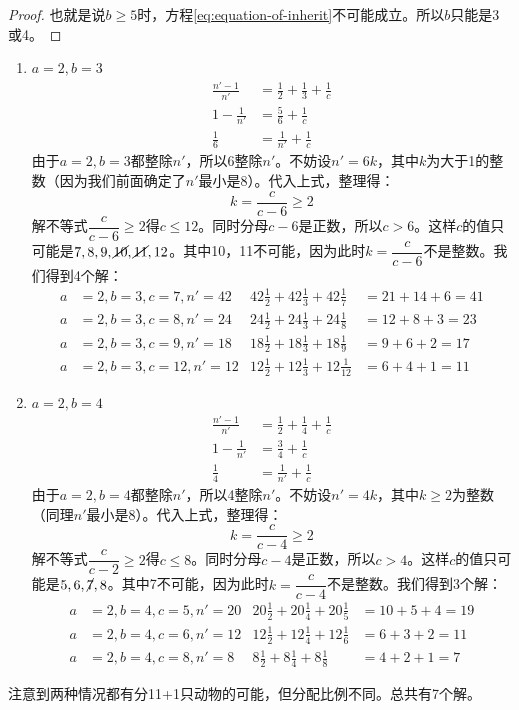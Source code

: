 \documentclass[b5paper]{ctexart}
\begin{document}
\begin{Answer}[ref={ex:fractions}]
{\begin{proof}
也就是说$b \geq 5$时，方程\cref{eq:equation-of-inherit}不可能成立。所以$b$只能是3或4。
\end{proof}

\begin{enumerate}[情况1)]
\item $a = 2, b = 3$
  \begin{align*}
    \frac{n'-1}{n'} &= \frac{1}{2} + \frac{1}{3} + \frac{1}{c} \\
    1 - \frac{1}{n'} &= \frac{5}{6} + \frac{1}{c} \\
    \frac{1}{6} &= \frac{1}{n'} + \frac{1}{c}
  \end{align*}
  由于$a = 2, b = 3$都整除$n'$，所以6整除$n'$。不妨设$n' = 6k$，其中$k$为大于1的整数（因为我们前面确定了$n'$最小是8）。代入上式，整理得：
  \[
  k = \frac{c}{c - 6} \geq 2
  \]
  解不等式$\dfrac{c}{c - 6} \geq 2$得$c \leq 12$。同时分母$c-6$是正数，所以$c > 6$。这样$c$的值只可能是$7, 8, 9, \cancel{10}, \cancel{11}, 12$。其中10，11不可能，因为此时$k = \dfrac{c}{c - 6}$不是整数。我们得到4个解：
  \begin{align*}
  a &= 2, b = 3, c = 7, n' = 42 & 42\frac{1}{2} + 42\frac{1}{3} + 42\frac{1}{7} &= 21 + 14 + 6 = 41 \\
  a &= 2, b = 3, c = 8, n' = 24 & 24\frac{1}{2} + 24\frac{1}{3} + 24\frac{1}{8} &= 12 + 8 + 3 = 23 \\
  a &= 2, b = 3, c = 9, n' = 18 & 18\frac{1}{2} + 18\frac{1}{3} + 18\frac{1}{9} &= 9 + 6 + 2 = 17 \\
  a &= 2, b = 3, c = 12, n' = 12 & 12\frac{1}{2} + 12\frac{1}{3} + 12\frac{1}{12} &= 6 + 4 + 1 = 11
  \end{align*}
\item $a = 2, b = 4$
  \begin{align*}
    \frac{n'-1}{n'} &= \frac{1}{2} + \frac{1}{4} + \frac{1}{c} \\
    1 - \frac{1}{n'} &= \frac{3}{4} + \frac{1}{c} \\
    \frac{1}{4} &= \frac{1}{n'} + \frac{1}{c}
  \end{align*}
  由于$a = 2, b = 4$都整除$n'$，所以4整除$n'$。不妨设$n' = 4k$，其中$k \geq 2 $为整数（同理$n'$最小是8）。代入上式，整理得：
  \[
  k = \frac{c}{c - 4} \geq 2
  \]
  解不等式$\dfrac{c}{c - 2} \geq 2$得$c \leq 8$。同时分母$c-4$是正数，所以$c > 4$。这样$c$的值只可能是$5, 6, \cancel{7}, 8$。其中7不可能，因为此时$k = \dfrac{c}{c - 4}$不是整数。我们得到3个解：
  \begin{align*}
  a &= 2, b = 4, c = 5, n' = 20 & 20\frac{1}{2} + 20\frac{1}{4} + 20\frac{1}{5} &= 10 + 5 + 4 = 19 \\
  a &= 2, b = 4, c = 6, n' = 12 & 12\frac{1}{2} + 12\frac{1}{4} + 12\frac{1}{6} &= 6 + 3 + 2 = 11 \\
  a &= 2, b = 4, c = 8, n' = 8 & 8\frac{1}{2} + 8\frac{1}{4} + 8\frac{1}{8} &= 4 + 2 + 1 = 7
  \end{align*}
\end{enumerate}
注意到两种情况都有分11+1只动物的可能，但分配比例不同。总共有7个解。

}
\end{Answer}
\end{document}
